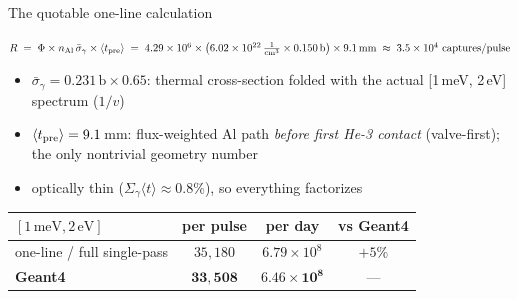 \documentclass[aspectratio=169,11pt]{beamer}
\begin{document}
\begin{frame}{The quotable one-line calculation}
  \begin{block}{}
    \centering
    $R \;=\; \Phi \times n_{\rm Al}\,\bar\sigma_{\gamma} \times
    \langle t_{\rm pre}\rangle
    \;=\; 4.29\times10^{6} \times \left(6.02\times10^{22}\,\tfrac{1}{\rm cm^{3}}
    \times 0.150\,{\rm b}\right) \times 9.1\,{\rm mm}
    \;\approx\; 3.5\times10^{4}\ \text{captures/pulse}$
  \end{block}
  \small
  \begin{itemize}
    \item $\bar\sigma_{\gamma} = 0.231\,\text{b} \times 0.65$: thermal
          cross-section folded with the actual [1\,meV, 2\,eV] spectrum ($1/v$)
    \item $\langle t_{\rm pre}\rangle = 9.1$\,mm: flux-weighted Al path
          \emph{before first He-3 contact} (valve-first); the only nontrivial
          geometry number
    \item optically thin ($\Sigma_\gamma \langle t\rangle \approx 0.8\%$), so
          everything factorizes
  \end{itemize}
  \medskip
  \centering
  \begin{tabular}{lccc}
    \toprule
    $[1\,\text{meV},2\,\text{eV}]$ & per pulse & per day & vs Geant4 \\
    \midrule
    one-line / full single-pass & $35{,}180$ & $6.79\times10^{8}$ & $+5\%$ \\
    \textbf{Geant4} & $\mathbf{33{,}508}$ & $\mathbf{6.46\times10^{8}}$ & --- \\
    \bottomrule
  \end{tabular}
\end{frame}
\end{document}
